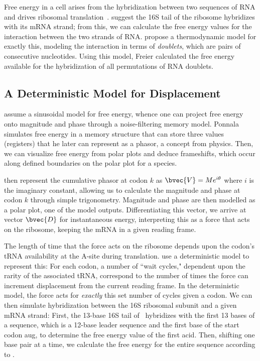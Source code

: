 \documentclass[12pt, draft]{article}
\numberwithin{equation}{section}
\begin{document}
Free energy in a cell arises from the hybridization between two
sequences of RNA and drives ribosomal translation~\cite{starmer}.
\citet{weiss88} suggest the 16S tail of the ribosome hybridizes with its mRNA strand;
from this, we can calculate the free energy values for the interaction between the two strands of RNA.
\citet{freier} propose a thermodynamic model for exactly this,
modeling the interaction in terms of \emph{doublets}, which are pairs of consecutive nucleotides.
Using this model, Freier calculated the free energy available
for the hybridization of all permutations of RNA doublets.

\subsection{A Deterministic Model for Displacement} 
 
\citet{lalit:mechanics} assume a sinusoidal model for
free energy, whence one can project free energy onto magnitude and
phase through a noise-filtering memory model. Ponnala simulates free
energy in a memory structure that can store three values (registers)
that he later can represent as a phasor, a concept from physics. Then,
we can visualize free energy from polar plots and deduce frameshifts,
which occur along defined boundaries on the polar plot for a species.
 
\citet{lalit:embs} then represent the cumulative phasor
at codon $k$ as $\bvec{V} = Me^{i\theta}$ where $i$ is the imaginary
constant, allowing us to calculate the magnitude and phase at codon
$k$ through simple trigonometry. Magnitude and phase are then modelled
as a polar plot, one of the model outputs. Differentiating this vector, we
arrive at vector $\bvec{D}$ for instantaneous energy, interpreting
this as a force that acts on the ribosome, keeping the mRNA in
a given reading frame.
 
The length of time that the force acts on the ribosome depends upon
the codon's tRNA availability at the A-site during translation.
\citeauthor{lalit:mechanics} use a deterministic model to represent this: For each codon,
a number of ``wait cycles," dependent upon the rarity of the
associated tRNA, correspond to the number of times the force can
increment displacement from the current reading frame.  In the
deterministic model, the force acts for \emph{exactly} this set number
of cycles given a codon. We can then simulate hybridization between the
16S ribosomal subunit and a given mRNA strand: First, the 13-base 16S
tail of \ecoli\ hybridizes with the first 13 bases of a sequence,
which is a 12-base leader sequence and the first base of the start
codon aug, to determine the free energy value of the first acid.
Then, shifting one base pair at a time, we calculate the free energy
for the entire sequence according to \citet{starmer}.
\end{document}

